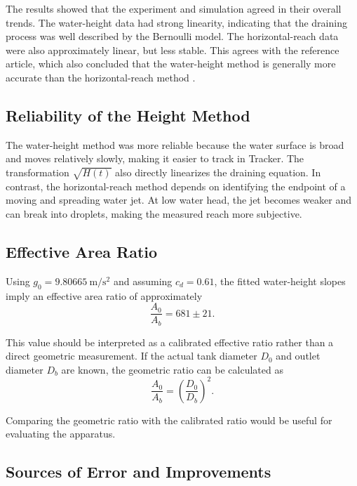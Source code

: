 \documentclass[11pt,letterpaper]{article}
\begin{document}
The results showed that the experiment and simulation agreed in their overall trends. The water-height data had strong linearity, indicating that the draining process was well described by the Bernoulli model. The horizontal-reach data were also approximately linear, but less stable. This agrees with the reference article, which also concluded that the water-height method is generally more accurate than the horizontal-reach method \cite{jang2024}.

\subsection{Reliability of the Height Method}

The water-height method was more reliable because the water surface is broad and moves relatively slowly, making it easier to track in Tracker. The transformation $\sqrt{H(t)}$ also directly linearizes the draining equation. In contrast, the horizontal-reach method depends on identifying the endpoint of a moving and spreading water jet. At low water head, the jet becomes weaker and can break into droplets, making the measured reach more subjective.

\subsection{Effective Area Ratio}

Using $g_0=9.80665~\mathrm{m/s^2}$ and assuming $c_d=0.61$, the fitted water-height slopes imply an effective area ratio of approximately
\begin{equation}
    \frac{A_0}{A_b}=681\pm21.
\end{equation}

This value should be interpreted as a calibrated effective ratio rather than a direct geometric measurement. If the actual tank diameter $D_0$ and outlet diameter $D_b$ are known, the geometric ratio can be calculated as
\begin{equation}
    \frac{A_0}{A_b}
    =
    \left(\frac{D_0}{D_b}\right)^2.
\end{equation}

Comparing the geometric ratio with the calibrated ratio would be useful for evaluating the apparatus.

\subsection{Sources of Error and Improvements}
\end{document}
